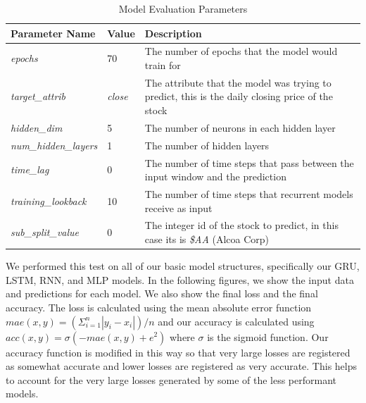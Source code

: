 \documentclass{ledger}
\begin{document}
\begin{table}[H]
    \begin{center}
        \caption{{Model Evaluation Parameters}}
        \label{tab:evalParams}
        \bgroup
        \def\arraystretch{1.2}
        \begin{tabular}{|p{4cm}|p{1cm}|p{8cm}|}
            \hline
            \textbf{Parameter Name} & \textbf{Value} & \textbf{Description}\\
            \hline
            \textit{epochs} & 70 & The number of epochs that the model would train for\\
            \hline
            \textit{target\_attrib} & \textit{close} & The attribute that the model was trying to predict, this is the daily closing price of the stock\\
            \hline
            \textit{hidden\_dim} & 5 & The number of neurons in each hidden layer\\
            \hline
            \textit{num\_hidden\_layers} & 1 & The number of hidden layers\\
            \hline
            \textit{time\_lag} & 0 & The number of time steps that pass between the input window and the prediction\\
            \hline
            \textit{training\_lookback} & 10 & The number of time steps that recurrent models receive as input\\
            \hline
            \textit{sub\_split\_value} & 0 & The integer id of the stock to predict, in this case its is \textit{\$AA} (Alcoa Corp)\\
            \hline
        \end{tabular}
        \egroup
    \end{center}
\end{table}

We performed this test on all of our basic model structures, specifically our GRU, LSTM, RNN, and MLP models.
In the following figures, we show the input data and predictions for each model.  We also show the final loss
and the final accuracy.  The loss is calculated using the mean absolute error function
$mae(x, y) = (\Sigma^n_{i=1} |y_i - x_i|) / n$ and our accuracy is calculated using
$acc(x, y) = \sigma(-mae(x, y)+e^2)$ where $\sigma$ is the sigmoid function.  Our accuracy function is modified
in this way so that very large losses are registered as somewhat accurate and lower losses are registered as
very accurate.  This helps to account for the very large losses generated by some of the less performant models.
\end{document}

